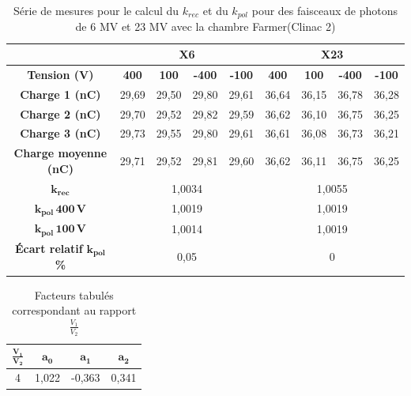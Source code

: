 \documentclass{article}
\begin{document}
\begin{table}[h]
  \centering
  \begin{tabular}{c|cccc|cccc|}
  \cline{2-9}
                                                     & \multicolumn{4}{c|}{\textbf{X6}} & \multicolumn{4}{c|}{\textbf{X23}} \\ \hline
  \multicolumn{1}{|c|}{\textbf{Tension (V)}} & \textbf{400} & \textbf{100} & \textbf{-400} & \textbf{-100} & \textbf{400} & \textbf{100} & \textbf{-400} & \textbf{-100} \\ \hline
  \multicolumn{1}{|c|}{\textbf{Charge 1 (nC)}}       & 29,69  & 29,50  & 29,80  & 29,61 & 36,64  & 36,15  & 36,78  & 36,28  \\
  \multicolumn{1}{|c|}{\textbf{Charge 2 (nC)}}       & 29,70   & 29,52  & 29,82  & 29,59 & 36,62  & 36,10  & 36,75  & 36,25  \\
  \multicolumn{1}{|c|}{\textbf{Charge 3 (nC)}}       & 29,73  & 29,55  & 29,80  & 29,61 & 36,61  & 36,08  & 36,73  & 36,21  \\
  \multicolumn{1}{|c|}{\textbf{Charge moyenne (nC)}} & 29,71  & 29,52  & 29,81  & 29,60 & 36,62  & 36,11  & 36,75  & 36,25  \\ \hline
  \multicolumn{1}{|c|}{$\mathbf{k_{rec}}$}                & \multicolumn{4}{c|}{1,0034}      & \multicolumn{4}{c|}{1,0055}       \\
  \multicolumn{1}{|c|}{$\mathbf{k_{pol} \, 400 \, V}$}          & \multicolumn{4}{c|}{1,0019}      & \multicolumn{4}{c|}{1,0019}       \\
  \multicolumn{1}{|c|}{$\mathbf{k_{pol} \, 100 \, V}$}          & \multicolumn{4}{c|}{1,0014}      & \multicolumn{4}{c|}{1,0019}       \\ 
  \multicolumn{1}{|c|}{\textbf{Écart relatif} $\mathbf{k_{pol}}$ \textbf{\%}} & \multicolumn{4}{c|}{0,05} & \multicolumn{4}{c|}{0} \\
  \hline
  \end{tabular}
  \caption{Série de mesures pour le calcul du $k_{rec}$ et du $k_{pol}$ pour des faisceaux de photons de 6 MV et 23 MV avec la chambre Farmer(Clinac 2)}
  \label{table_kpol}
\end{table}



\begin{table}[h]
  \centering
  \begin{tabular}{cccc}
    \toprule
    $\mathbf{\frac{V_1}{V_2}}$ & $\mathbf{a_0}$ & $\mathbf{a_1}$ & $\mathbf{a_2}$\\
    \toprule
    4 & 1,022 & -0,363 & 0,341\\
    \bottomrule    
  \end{tabular}
  \caption{Facteurs tabulés correspondant au rapport $\frac{V_1}{V_2}$}
  \label{table_facteurs_krec}
\end{table}
\end{document}
